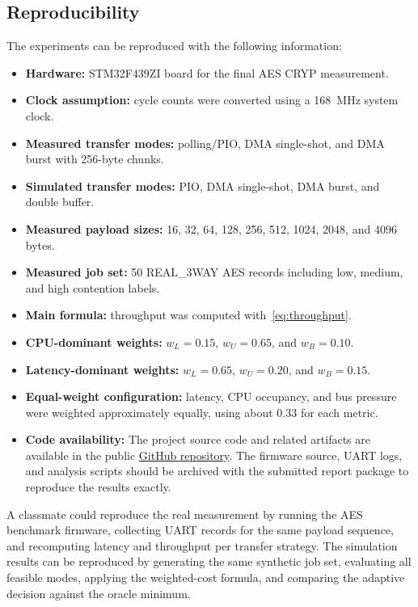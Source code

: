 \documentclass[conference]{IEEEtran}
\begin{document}
\subsection{Reproducibility}
The experiments can be reproduced with the following information:
\begin{itemize}
    \item \textbf{Hardware:} STM32F439ZI board for the final AES CRYP measurement.
    \item \textbf{Clock assumption:} cycle counts were converted using a 168~MHz system clock.
    \item \textbf{Measured transfer modes:} polling/PIO, DMA single-shot, and DMA burst with 256-byte chunks.
    \item \textbf{Simulated transfer modes:} PIO, DMA single-shot, DMA burst, and double buffer.
    \item \textbf{Measured payload sizes:} 16, 32, 64, 128, 256, 512, 1024, 2048, and 4096 bytes.
    \item \textbf{Measured job set:} 50 REAL\_3WAY AES records including low, medium, and high contention labels.
    \item \textbf{Main formula:} throughput was computed with~\eqref{eq:throughput}.
    \item \textbf{CPU-dominant weights:} $w_L=0.15$, $w_U=0.65$, and $w_B=0.10$.
    \item \textbf{Latency-dominant weights:} $w_L=0.65$, $w_U=0.20$, and $w_B=0.15$.
    \item \textbf{Equal-weight configuration:} latency, CPU occupancy, and bus pressure were weighted approximately equally, using about $0.33$ for each metric.
    \item \textbf{Code availability:} The project source code and related artifacts are available in the public \href{https://github.com/egekarakaya/CMP720-Data-Movement-Strategy-Selection-for-AES-ECDSA-Accelerator-Workloads-on-an-STM32H7-Series-MCU}{GitHub repository}. The firmware source, UART logs, and analysis scripts should be archived with the submitted report package to reproduce the results exactly.
\end{itemize}
A classmate could reproduce the real measurement by running the AES benchmark firmware, collecting UART records for the same payload sequence, and recomputing latency and throughput per transfer strategy. The simulation results can be reproduced by generating the same synthetic job set, evaluating all feasible modes, applying the weighted-cost formula, and comparing the adaptive decision against the oracle minimum.
\end{document}

